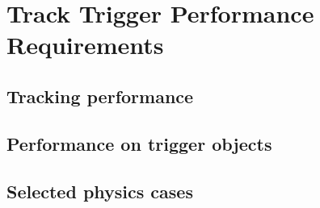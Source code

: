 \section{Track Trigger Performance Requirements}

\subsection{Tracking performance}

\subsection{Performance on trigger objects}

\subsection{Selected physics cases}

\clearpage
